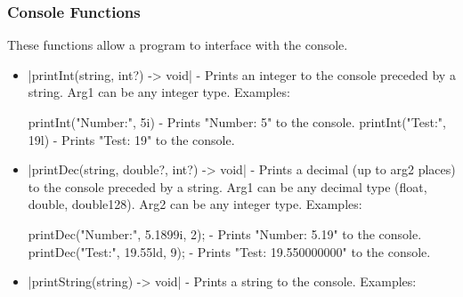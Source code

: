 \documentclass[12pt, letterpaper, oneside]{article}
\begin{document}
	\subsubsection{Console Functions}
	These functions allow a program to interface with the console.
	\begin{itemize}
		\item[--] \spverb|printInt(string, int?) -> void| - Prints an integer to the console preceded by a string. Arg1 can be any integer type. Examples: 
		
		
		\begin{spverbatim}
			printInt("Number:", 5i) - Prints "Number: 5" to the console.
			printInt("Test:", 19l) - Prints "Test: 19" to the console.
		\end{spverbatim}
		\item[--] \spverb|printDec(string, double?, int?) -> void| - Prints a decimal (up to arg2 places) to the console preceded by a string. Arg1 can be any decimal type (float, double, double128). Arg2 can be any integer type. Examples: 
		
		
		\begin{spverbatim}
			printDec("Number:", 5.1899i, 2); - Prints "Number: 5.19" to the console.
			printDec("Test:", 19.55ld, 9); - Prints "Test: 19.550000000" to the console.
		\end{spverbatim}
		\item[--] \spverb|printString(string) -> void| - Prints a string to the console. Examples:
		

\end{itemize}
\end{document}
